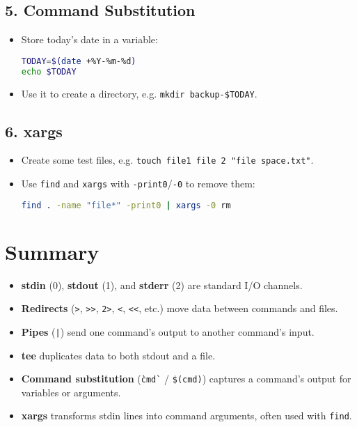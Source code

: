 \documentclass[a4paper]{report}
\begin{document}
\subsection*{5. Command Substitution}
\begin{itemize}
    \item Store today’s date in a variable:


\begin{lstlisting}[language=bash]
TODAY=$(date +%Y-%m-%d)
echo $TODAY
\end{lstlisting}


    \item Use it to create a directory, e.g. \texttt{mkdir backup-\$TODAY}.
\end{itemize}

\subsection*{6. xargs}
\begin{itemize}
    \item Create some test files, e.g. \texttt{touch file1 file 2 "file space.txt"}.  
    \item Use \texttt{find} and \texttt{xargs} with \texttt{-print0}/\texttt{-0} to remove them:


\begin{lstlisting}[language=bash]
find . -name "file*" -print0 | xargs -0 rm
\end{lstlisting}
\end{itemize}

\section*{Summary}

\begin{itemize}
    \item \textbf{stdin} (0), \textbf{stdout} (1), and \textbf{stderr} (2) are standard I/O channels.
    \item \textbf{Redirects} (\texttt{>}, \texttt{>>}, \texttt{2>}, \texttt{<}, \texttt{<<}, etc.) move data between commands and files.
    \item \textbf{Pipes} (\texttt{|}) send one command’s output to another command’s input.
    \item \textbf{tee} duplicates data to both stdout and a file.
    \item \textbf{Command substitution} (\texttt{\`cmd\`} / \texttt{\$(cmd)}) captures a command’s output for variables or arguments.
    \item \textbf{xargs} transforms stdin lines into command arguments, often used with \texttt{find}.
\end{itemize}
\end{document}
